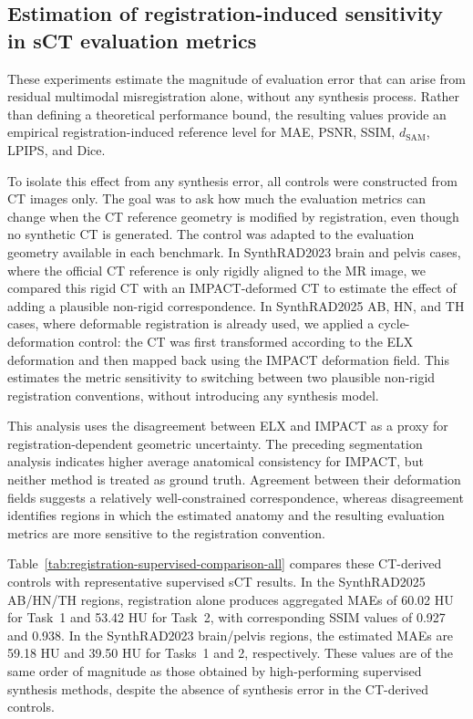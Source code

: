\documentclass[lettersize,journal]{IEEEtran}
\begin{document}
\subsection{Estimation of registration-induced sensitivity in sCT evaluation metrics}

These experiments estimate the magnitude of evaluation error that can arise from residual multimodal misregistration alone, without any synthesis process. Rather than defining a theoretical performance bound, the resulting values provide an empirical registration-induced reference level for MAE, PSNR, SSIM, $d_{\mathrm{SAM}}$, LPIPS, and Dice.

To isolate this effect from any synthesis error, all controls were constructed from CT images only. The goal was to ask how much the evaluation metrics can change when the CT reference geometry is modified by registration, even though no synthetic CT is generated. The control was adapted to the evaluation geometry available in each benchmark. In SynthRAD2023 brain and pelvis cases, where the official CT reference is only rigidly aligned to the MR image, we compared this rigid CT with an IMPACT-deformed CT to estimate the effect of adding a plausible non-rigid correspondence. In SynthRAD2025 AB, HN, and TH cases, where deformable registration is already used, we applied a cycle-deformation control: the CT was first transformed according to the ELX deformation and then mapped back using the IMPACT deformation field. This estimates the metric sensitivity to switching between two plausible non-rigid registration conventions, without introducing any synthesis model.

This analysis uses the disagreement between ELX and IMPACT as a proxy for registration-dependent geometric uncertainty. The preceding segmentation analysis indicates higher average anatomical consistency for IMPACT, but neither method is treated as ground truth. Agreement between their deformation fields suggests a relatively well-constrained correspondence, whereas disagreement identifies regions in which the estimated anatomy and the resulting evaluation metrics are more sensitive to the registration convention.

Table~\ref{tab:registration-supervised-comparison-all} compares these CT-derived controls with representative supervised sCT results. In the SynthRAD2025 AB/HN/TH regions, registration alone produces aggregated MAEs of 60.02 HU for Task~1 and 53.42 HU for Task~2, with corresponding SSIM values of 0.927 and 0.938. In the SynthRAD2023 brain/pelvis regions, the estimated MAEs are 59.18 HU and 39.50 HU for Tasks~1 and 2, respectively. These values are of the same order of magnitude as those obtained by high-performing supervised synthesis methods, despite the absence of synthesis error in the CT-derived controls.
\end{document}
